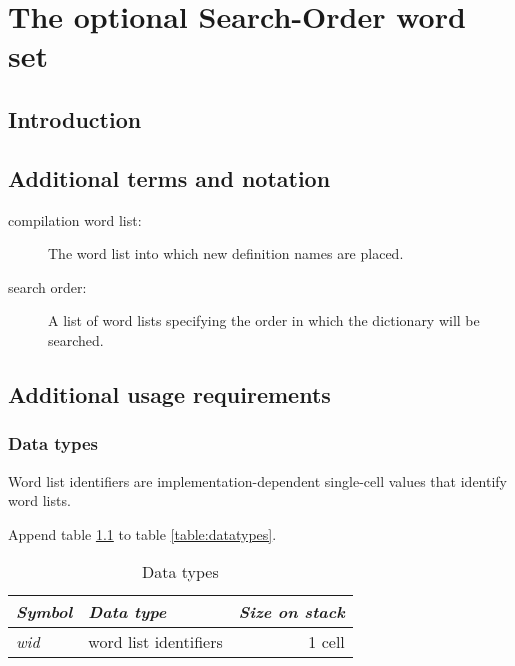 \chapter{The optional Search-Order word set} %

\section{Introduction} %

\section{Additional terms and notation} %

\begin{description}
\item[compilation word list:]
	The word list into which new definition names are placed.

\item[search order:]
	A list of word lists specifying the order in which the
	dictionary will be searched.
\end{description}

\section{Additional usage requirements} %

\subsection{Data types} %

Word list identifiers are implementation-dependent single-cell
values that identify word lists.

Append table \ref{search:types} to table \ref{table:datatypes}.

\begin{table}[h]
  \begin{center}
	\caption{Data types}
	\label{search:types}
	\begin{tabular}{llr}
	\hline\hline
	\emph{Symbol} & \emph{Data type} & \emph{Size on stack} \\
	\hline
	\emph{wid}		& word list identifiers	& 1 cell \\
	\hline\hline
	\end{tabular}
  \end{center}
\end{table}


